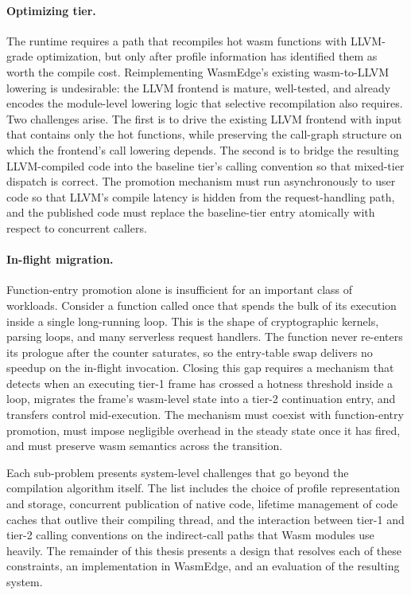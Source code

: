 \paragraph{Optimizing tier.} The runtime requires a path that recompiles hot wasm functions with LLVM-grade optimization, but only after profile information has identified them as worth the compile cost. Reimplementing WasmEdge's existing wasm-to-LLVM lowering is undesirable: the LLVM frontend is mature, well-tested, and already encodes the module-level lowering logic that selective recompilation also requires. Two challenges arise. The first is to drive the existing LLVM frontend with input that contains only the hot functions, while preserving the call-graph structure on which the frontend's call lowering depends. The second is to bridge the resulting LLVM-compiled code into the baseline tier's calling convention so that mixed-tier dispatch is correct. The promotion mechanism must run asynchronously to user code so that LLVM's compile latency is hidden from the request-handling path, and the published code must replace the baseline-tier entry atomically with respect to concurrent callers.

\paragraph{In-flight migration.} Function-entry promotion alone is insufficient for an important class of workloads. Consider a function called once that spends the bulk of its execution inside a single long-running loop. This is the shape of cryptographic kernels, parsing loops, and many serverless request handlers. The function never re-enters its prologue after the counter saturates, so the entry-table swap delivers no speedup on the in-flight invocation. Closing this gap requires a mechanism that detects when an executing tier-1 frame has crossed a hotness threshold inside a loop, migrates the frame's wasm-level state into a tier-2 continuation entry, and transfers control mid-execution. The mechanism must coexist with function-entry promotion, must impose negligible overhead in the steady state once it has fired, and must preserve wasm semantics across the transition.

Each sub-problem presents system-level challenges that go beyond the compilation algorithm itself. The list includes the choice of profile representation and storage, concurrent publication of native code, lifetime management of code caches that outlive their compiling thread, and the interaction between tier-1 and tier-2 calling conventions on the indirect-call paths that Wasm modules use heavily. The remainder of this thesis presents a design that resolves each of these constraints, an implementation in WasmEdge, and an evaluation of the resulting system.


